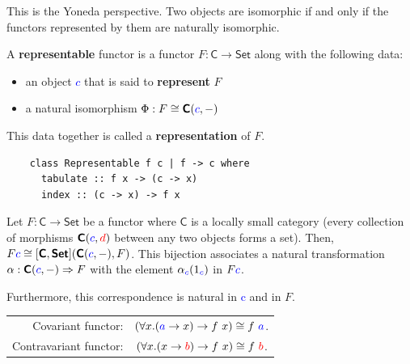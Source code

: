 \documentclass[tikz]{beamer}
\newcommand{\cat}[1]{\bm{ \mathsf{#1} }}
\newcommand{\cc}{\cat{C}}
\newcommand{\red}[1]{\textcolor{red}{#1}}
\newcommand{\blue}[1]{\textcolor{blue}{#1}}
\newcommand{\mblue}[1]{\textcolor{blue}{$#1$}}
\theoremstyle{definition}
\begin{document}
\frame
{
	This is the Yoneda perspective. Two objects are isomorphic if and only if the functors represented by them are naturally isomorphic.	
}

\frame
{
	\begin{definition}
		A \textbf{representable} functor is a functor $F : \cc \to \cat{Set}$ along with the following data: 
		
		\begin{itemize}
			\item an object \mblue{c} that is said to \textbf{represent} $F$
			\item a natural isomorphism $\Phi : F \cong \cc(\blue{c}, -)$
		\end{itemize}
		
		This data together is called a \textbf{representation} of $F$. 
	\end{definition}
}

\begin{frame}[fragile]

	\begin{verbatim}
	class Representable f c | f -> c where
	  tabulate :: f x -> (c -> x)
	  index :: (c -> x) -> f x
	\end{verbatim}
\end{frame}

\frame
{
	\begin{definition}
		Let $F : \cc \to \cat{Set}$ be a functor where $\cc$ is a locally small category (every collection of morphisms $\cc(\blue{c}, \red{d})$ between any two objects forms a set). Then, $F\blue{c} \cong [\cc, \cat{Set}](\cc(\blue{c}, -), F)$. This bijection associates a natural transformation $\alpha : \cc(\blue{c}, -) \Rightarrow F$ with the element $\alpha_{\blue{c}}(1_{\blue{c}})$ in $F\blue{c}$. 
	\end{definition}
}

\frame
{
	Furthermore, this correspondence is natural in \blue{c} and in $F$.
}

\frame
{
\begin{definition}
\begin{tabular}{rc}

Covariant functor: & $(\forall x. (\blue{a} \to x) \to f~x) \cong f~\blue{a}$. \\
Contravariant functor:     & $(\forall x. (x \to \red{b}) \to f~x) \cong f~\red{b}$. 
\end{tabular}
\end{definition}
}
\end{document}
